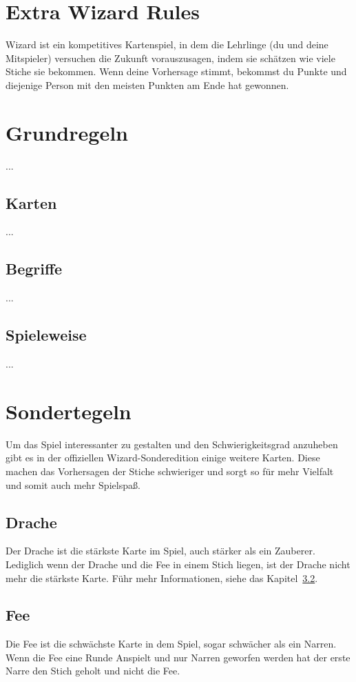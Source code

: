 \documentclass[3pt]{article}
\begin{document}
\section{Extra Wizard Rules}
Wizard ist ein kompetitives Kartenspiel, in dem die Lehrlinge (du und deine Mitspieler) versuchen die Zukunft vorauszusagen, indem sie schätzen wie viele Stiche sie bekommen.
Wenn deine Vorhersage stimmt, bekommst du Punkte und diejenige Person mit den meisten Punkten am Ende hat gewonnen.

\section{Grundregeln}
...

\subsection{Karten}
...

\subsection{Begriffe}
...

\subsection{Spieleweise}
...

\section{Sondertegeln}
Um das Spiel interessanter zu gestalten und den Schwierigkeitsgrad anzuheben gibt es in der offiziellen Wizard-Sonderedition einige weitere Karten.
Diese machen das Vorhersagen der Stiche schwieriger und sorgt so für mehr Vielfalt und somit auch mehr Spielspaß.

\subsection{Drache}
Der Drache ist die stärkste Karte im Spiel, auch stärker als ein Zauberer.
Lediglich wenn der Drache und die Fee in einem Stich liegen, ist der Drache nicht mehr die stärkste Karte.
Führ mehr Informationen, siehe das Kapitel~\ref{cha:fairy}.

\subsection{Fee}\label{cha:fairy}
Die Fee ist die schwächste Karte in dem Spiel, sogar schwächer als ein Narren.
Wenn die Fee eine Runde Anspielt und nur Narren geworfen werden hat der erste Narre den Stich geholt und nicht die Fee.
\end{document}
